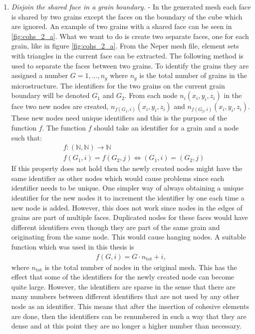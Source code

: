 \documentclass[grain_boundary_law.tex]{subfiles}
\begin{document}
\begin{enumerate}
\item \textit{Disjoin the shared face in a grain boundary.} - In the generated mesh each face is shared by two grains except the faces on the boundary of the cube which are ignored. An example of two grains with a shared face can be seen in \ref{fig:cohs_2_a}. What we want to do is create two separate faces, one for each grain, like in figure \ref{fig:cohs_2_a}. From the Neper mesh file, element sets with triangles in the current face can be extracted. The following method is used to separate the faces between two grains. To identify the grains they are assigned a number $G = 1,\ldots , n_g$ where $n_g$ is the total number of grains in the microstructure. The identifiers for the two grains on the current grain boundary will be denoted $G_1$ and $G_2$. From each node $n_i (x_i, y_i, z_i)$ in the face two new nodes are created, $n_{f(G_1,i)} (x_i, y_i, z_i)$ and $n_{f(G_2,i)} (x_i, y_i, z_i)$. These new nodes need unique identifiers and this is the purpose of the function $f$. The function $f$ should take an identifier for a grain and a node such that:
%
\begin{align}&  f: (\mathbb{N},\mathbb{N}) \rightarrow \mathbb{N} \\
 & f(G_1, i) = f(G_2, j) \Leftrightarrow (G_1, i) = (G_2, j) 
\end{align}
%
If this property does not hold then the newly created nodes might have the same identifier as other nodes which would cause problems since each identifier needs to be unique. One simpler way of always obtaining a unique identifier for the new nodes it to increment the identifier by one each time a new node is added. However, this does not work since nodes in the edges of grains are part of multiple faces. Duplicated nodes for these faces would have different identifiers even though they are part of the same grain and originating from the same node. This would cause hanging nodes. A suitable function which was used in this thesis is
%
\begin{align} 
  f(G, i) = G \cdot n_\text{tot} + i,
\end{align}
%
where $n_\text{tot}$ is the total number of nodes in the original mesh. This has the effect that some of the identifiers for the newly created node can become quite large. However, the identifiers are sparse in the sense that there are many numbers between different identifiers that are not used by any other node as an identifier. This means that after the insertion of cohesive elements are done, then the identifiers can be renumbered in such a way that they are dense and at this point they are no longer a higher number than necessary.


\end{enumerate}
\end{document}
